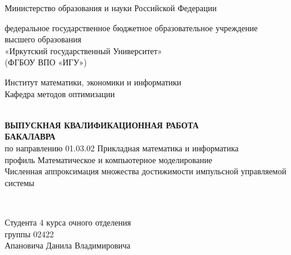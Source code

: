 \begin{titlepage}
  \newpage
\thispagestyle{empty} %

{
  
  \begin{center}   
    Министерство образования и науки Российской Федерации\\ 
    \begin{spacing}{1.0} 
      федеральное государственное бюджетное образовательное учреждение \\ 
      высшего  образования \\ 
      «Иркутский государственный Университет» \\ 
      (ФГБОУ ВПО «ИГУ») 
    \end{spacing} 
    
    
    
    Институт математики, экономики и информатики 
    \\ 
    Кафедра методов оптимизации 
    
    
    
    ~\\[1.3cm] 
    
    { \bf 
      ВЫПУСКНАЯ КВАЛИФИКАЦИОННАЯ РАБОТА\\БАКАЛАВРА } 
    \\[0.3cm] 
    по направлению 01.03.02 Прикладная математика и информатика 
    \\ 
    профиль Математическое и компьютерное моделирование 
    \\[1.7cm] 
    
    { 
      Численная аппроксимация множества достижимости импульсной
      управляемой системы 
    } 
    
    
    ~\\[1.3cm] 
    
    \begin{multicols}{2} 
      \begin{flushleft} 
        \phantom{Четкая подпись} 
        \vspace{0.5cm} 
        
        \phantom{Четкая подпись} 
        \phantom{Четкая подпись} 
        \phantom{Четкая подпись} 
        \phantom{Четкая подпись} 
        \phantom{Четкая подпись} 
        \phantom{Четкая подпись} 
        \phantom{Четкая подпись} 
        \vspace{0.2cm} 
        
        \begin{spacing}{1.0} 
          Студента 4 курса очного отделения 
          \\группы 02422
          \\Апановича Данила Владимировича
          \vspace{0.5cm} 
          

\end{spacing}
\end{flushleft}
\end{multicols}
\end{center}}
\end{titlepage}

